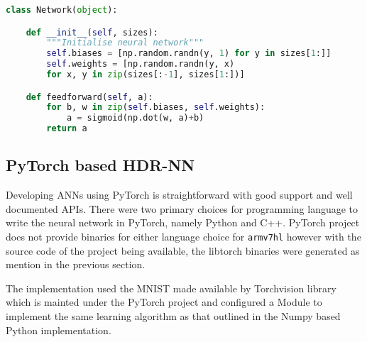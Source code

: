 \begin{lstlisting}[language=Python]
	class Network(object):

	def __init__(self, sizes):
		"""Initialise neural network"""
		self.biases = [np.random.randn(y, 1) for y in sizes[1:]]
		self.weights = [np.random.randn(y, x)
		for x, y in zip(sizes[:-1], sizes[1:])]

	def feedforward(self, a):
		for b, w in zip(self.biases, self.weights):
			a = sigmoid(np.dot(w, a)+b)
		return a
\end{lstlisting}



\subsection{PyTorch based HDR-NN}

Developing ANNs using PyTorch is straightforward with good support and well documented APIs. There were two primary choices for programming language to write the neural network in PyTorch, namely Python and C++. PyTorch project does not provide binaries for either language choice for \texttt{armv7hl} however with the source code of the project being available, the libtorch binaries were generated as mention in the previous section.

The implementation used the MNIST made available by Torchvision library which is mainted under the PyTorch project and configured a Module to implement the same learning algorithm as that outlined in the Numpy based Python implementation.

